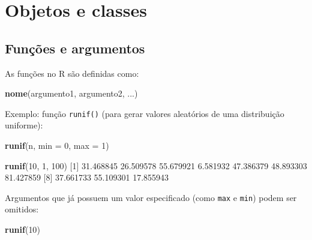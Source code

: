 \documentclass[10pt,a4paper]{book}
\newenvironment{Shaded}{\begin{snugshade}}{\end{snugshade}}
\newcommand{\KeywordTok}[1]{\textcolor[rgb]{0.13,0.29,0.53}{\textbf{#1}}}
\newcommand{\DataTypeTok}[1]{\textcolor[rgb]{0.13,0.29,0.53}{#1}}
\newcommand{\DecValTok}[1]{\textcolor[rgb]{0.00,0.00,0.81}{#1}}
\newcommand{\FloatTok}[1]{\textcolor[rgb]{0.00,0.00,0.81}{#1}}
\newcommand{\NormalTok}[1]{#1}
\begin{document}
\chapter{Objetos e classes}\label{objetos-e-classes}

\section{Funções e argumentos}\label{funcoes-e-argumentos}

As funções no R são definidas como:

\begin{Shaded}
\begin{Highlighting}[]
\KeywordTok{nome}\NormalTok{(argumento1, argumento2, ...)}
\end{Highlighting}
\end{Shaded}

Exemplo: função \texttt{runif()} (para gerar valores aleatórios de uma
distribuição uniforme):

\begin{Shaded}
\begin{Highlighting}[]
\KeywordTok{runif}\NormalTok{(n, }\DataTypeTok{min =} \DecValTok{0}\NormalTok{, }\DataTypeTok{max =} \DecValTok{1}\NormalTok{)}
\end{Highlighting}
\end{Shaded}

\begin{Shaded}
\begin{Highlighting}[]
\KeywordTok{runif}\NormalTok{(}\DecValTok{10}\NormalTok{, }\DecValTok{1}\NormalTok{, }\DecValTok{100}\NormalTok{)}
\NormalTok{ [}\DecValTok{1}\NormalTok{] }\FloatTok{31.468845} \FloatTok{26.509578} \FloatTok{55.679921}  \FloatTok{6.581932} \FloatTok{47.386379} \FloatTok{48.893303} \FloatTok{81.427859}
\NormalTok{ [}\DecValTok{8}\NormalTok{] }\FloatTok{37.661733} \FloatTok{55.109301} \FloatTok{17.855943}
\end{Highlighting}
\end{Shaded}

Argumentos que já possuem um valor especificado (como \texttt{max} e
\texttt{min}) podem ser omitidos:

\begin{Shaded}
\begin{Highlighting}[]
\KeywordTok{runif}\NormalTok{(}\DecValTok{10}\NormalTok{)}
\end{Highlighting}
\end{Shaded}
\end{document}
